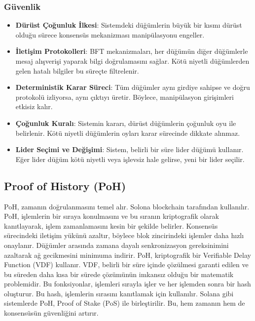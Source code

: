 \subsubsection{Güvenlik}

\begin{itemize}
    \item \textbf{Dürüst Çoğunluk İlkesi}: Sistemdeki düğümlerin büyük bir kısmı dürüst olduğu sürece konsensüs mekanizması manipülasyonu engeller.
    \item \textbf{İletişim Protokolleri}: BFT mekanizmaları, her düğümün diğer düğümlerle mesaj alışverişi yaparak bilgi doğrulamasını sağlar. Kötü niyetli düğümlerden gelen hatalı bilgiler bu süreçte filtrelenir.
    \item \textbf{Deterministik Karar Süreci}: Tüm düğümler aynı girdiye sahipse ve doğru protokolü izliyorsa, aynı çıktıyı üretir. Böylece, manipülasyon girişimleri etkisiz kalır.
    \item \textbf{Çoğunluk Kuralı}: Sistemin kararı, dürüst düğümlerin çoğunluk oyu ile belirlenir. Kötü niyetli düğümlerin oyları karar sürecinde dikkate alınmaz.
    \item \textbf{Lider Seçimi ve Değişimi}: Sistem, belirli bir süre lider düğümü kullanır. Eğer lider düğüm kötü niyetli veya işlevsiz hale gelirse, yeni bir lider seçilir.
\end{itemize}

\newpage

\subsection{Proof of History (PoH)}

PoH, zamanın doğrulanmasını temel alır. Solona blockchain tarafından kullanılır. PoH, işlemlerin bir sıraya konulmasını ve bu sıranın kriptografik olarak kanıtlayarak, işlem zamanlamasını kesin bir şekilde belirler. Konsensüs sürecindeki iletişim yükünü azaltır, böylece blok zincirindeki işlemler daha hızlı onaylanır. Düğümler arasında zamana dayalı senkronizasyon gereksinimini azaltarak ağ gecikmesini minimuma indirir. PoH, kriptografik bir Verifiable Delay Function (VDF) kullanır. VDF, belirli bir süre içinde çözülmesi garanti edilen ve bu süreden daha kısa bir sürede çözümünün imkansız olduğu bir matematik problemidir. Bu fonksiyonlar, işlemleri sırayla işler ve her işlemden sonra bir hash oluşturur. Bu hash, işlemlerin sırasını kanıtlamak için kullanılır. Solana gibi sistemlerde PoH, Proof of Stake (PoS) ile birleştirilir. Bu, hem zamanın hem de konsensüsün güvenliğini artırır.

